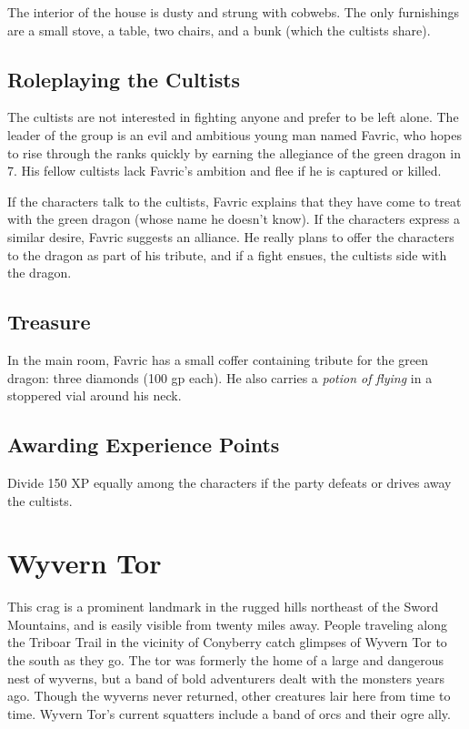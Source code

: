 \documentclass[10pt,a4paper,twoside,bg=print,twocolumn,openany,nodeprecatedcode]{dndbook}
\begin{document}
The interior of the house is dusty and strung with cobwebs. The only furnishings are a small stove, a table, two chairs, and a bunk (which the cultists share).

\subsection{Roleplaying the Cultists}
The cultists are not interested in fighting anyone and prefer to be left alone. The leader of the group is an evil and ambitious young man named Favric, who hopes to rise through the ranks quickly by earning the allegiance of the green dragon in 7. His fellow cultists lack Favric's ambition and flee if he is captured or killed.

If the characters talk to the cultists, Favric explains that they have come to treat with the green dragon (whose name he doesn't know). If the characters express a similar desire, Favric suggests an alliance. He really plans to offer the characters to the dragon as part of his tribute, and if a fight ensues, the cultists side with the dragon.

\subsection{Treasure}
In the main room, Favric has a small coffer containing tribute for the green dragon: three diamonds (100 gp each). He also carries a \textit{potion of flying} in a stoppered vial around his neck.

\subsection{Awarding Experience Points}
Divide 150 XP equally among the characters if the party defeats or drives away the cultists.

\section{Wyvern Tor}
This crag is a prominent landmark in the rugged hills northeast of the Sword Mountains, and is easily visible from twenty miles away. People traveling along the Triboar Trail in the vicinity of Conyberry catch glimpses of Wyvern Tor to the south as they go. The tor was formerly the home of a large and dangerous nest of wyverns, but a band of bold adventurers dealt with the monsters years ago. Though the wyverns never returned, other creatures lair here from time to time. Wyvern Tor's current squatters include a band of orcs and their ogre ally.
\end{document}
